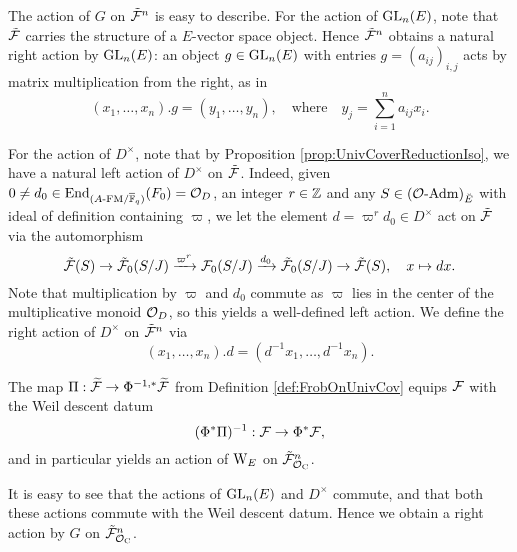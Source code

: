 \documentclass[../main.tex]{subfiles}
\begin{document}
The action of $G$ on $\tilde {\mathcal{F}}^n$ is easy to describe. For the action of
$\operatorname{GL}_n(E)$, note that $\tilde {\mathcal{F}}$ carries the structure of a $E$-vector space
object. Hence $\tilde {\mathcal{F}}^n$ obtains a natural right action by $\operatorname{GL}_n(E)$: an
object $g \in \operatorname{GL}_n(E)$ with entries $g = (a_{ij})_{i,j}$ acts by matrix
multiplication from the right, as in 
\begin{equation}\label{eq:UnivCoverGLnAction}
  (x_1, \dots, x_n).g = (y_1, \dots, y_n), \quad
  \text{where} \quad y_j = \sum_{i=1}^n a_{ij} x_i. 
\end{equation}

For the action of $D^\times$, note that by Proposition
\ref{prop:UnivCoverReductionIso}, we have 
a natural left action of $D^\times$ on $\tilde {\mathcal{F}}$. 
Indeed, given $0 \neq d_0 \in \operatorname{End}_{{({A}\text-\allowbreak\mathrm{FM}/{{\overline {\mathbb{F}}_q}})}}(F_0) = \mathcal{O}_D$, an
integer $r \in \mathbb{Z}$ and any $S \in {({\mathcal{O}}\text-\allowbreak\mathrm{Adm})}_{\breve {E}}$ with ideal of definition
containing $\varpi$, 
we let the element $d = \varpi^r d_0 \in D^\times$ act on $\tilde {\mathcal{F}}$ via the
automorphism
\begin{equation*}
  \tilde {\mathcal{F}}(S) \to \tilde {\mathcal{F}}_0(S/J) \xrightarrow{\varpi^{r}} \mathcal{F}_0(S/J) \xrightarrow{d_0}
  \tilde {\mathcal{F}}_0(S/J) \to \tilde {\mathcal{F}}(S), \quad x \mapsto dx.
\end{equation*}
Note that multiplication by $\varpi$ and $d_0$ commute as $\varpi$ lies in the 
center of the multiplicative monoid $\mathcal{O}_D$, so this yields a well-defined
left action. We define the right action of $D^\times$ on $\tilde {\mathcal{F}}^n$ via
\begin{equation*}
  (x_1, \dots, x_n).d = (d^{-1} x_1, \dots, d^{-1} x_n).
\end{equation*}


The map $\Pi: \widetilde{\mathcal{F}} \to \Phi^{-1,*}\widetilde{\mathcal{F}}$ from Definition 
\ref{def:FrobOnUnivCov} equips $\mathcal{F}$ with the Weil descent datum
\begin{equation*}
  (\Phi^*{\Pi})^{-1}: \mathcal{F} \to \Phi^*\mathcal{F},
\end{equation*}
and in particular yields an action of $\mathrm W_E$ on $\tilde {\mathcal{F}}_{\mathcal{O}_{\mathrm{C}}}^n$. 

It is easy to see that the actions of $\operatorname{GL}_n(E)$ and $D^\times$ commute,
and that both these actions commute with the Weil descent datum. Hence we
obtain a right action by $G$ on $\tilde {\mathcal{F}}^n_{\mathcal{O}_{\mathrm{C}}}$.
\end{document}
